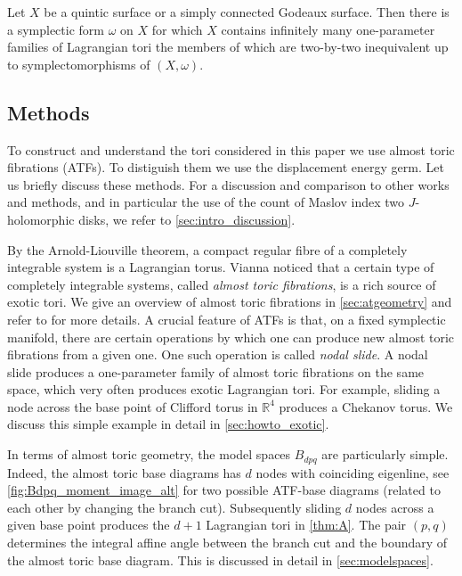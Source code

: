 \documentclass[12pt,a4paper,abstract=true,draft]{scrartcl}
\begin{document}
\begin{corollary}
    \label{thm:quinticgodeaux}
    Let $X$ be a quintic surface or a simply connected Godeaux surface.
Then there is a symplectic form $\omega$ on $X$ for which $X$ contains infinitely many one-parameter families of Lagrangian tori the members of which are two-by-two inequivalent up to symplectomorphisms of $(X,\omega)$.
\end{corollary}

\subsection{Methods}
\label{sec:intro_methods}

To construct and understand the tori considered in this paper we use almost toric fibrations (ATFs).
To distiguish them we use the displacement energy germ.
Let us briefly discuss these methods.
For a discussion and comparison to other works and methods, and in particular the use of the count of Maslov index two $J$-holomorphic disks, we refer to \cref{sec:intro_discussion}.

By the Arnold-Liouville theorem, a compact regular fibre of a completely integrable system is a Lagrangian torus. Vianna \cite{Via16,Via17} noticed that a certain type of completely integrable systems, called \emph{almost toric fibrations}, is a rich source of exotic tori. We give an overview of almost toric fibrations in \cref{sec:atgeometry} and refer to \cite{evans2021atfs} for more details. A crucial feature of ATFs is that, on a fixed symplectic manifold, there are certain operations by which one can produce new almost toric fibrations from a given one. One such operation is called \emph{nodal slide}. A nodal slide produces a one-parameter family of almost toric fibrations on the same space, which very often produces exotic Lagrangian tori. For example, sliding a node across the base point of Clifford torus in $\mathbb{R}^4$ produces a Chekanov torus. We discuss this simple example in detail in \cref{sec:howto_exotic}.

In terms of almost toric geometry, the model spaces $B_{dpq}$ are particularly simple.
Indeed, the almost toric base diagrams has $d$ nodes with coinciding eigenline, see \cref{fig:Bdpq_moment_image_alt} for two possible ATF-base diagrams (related to each other by changing the branch cut). Subsequently sliding $d$ nodes across a given base point produces the $d+1$ Lagrangian tori in \cref{thm:A}.
The pair $(p,q)$ determines the integral affine angle between the branch cut and the boundary of the almost toric base diagram.
This is discussed in detail in \cref{sec:modelspaces}.
\end{document}
